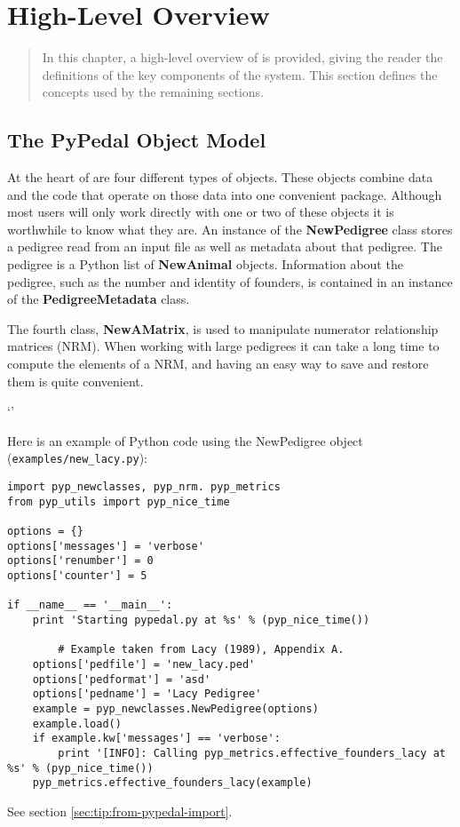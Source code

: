 \chapter{High-Level Overview}
\label{cha:high-level-overview}

\begin{quote} 
   In this chapter, a high-level overview of \PYPEDAL{} is provided, giving
   the reader the definitions of the key components of the system. This section
   defines the concepts used by the remaining sections.
\end{quote}

\section{The PyPedal Object Model}
\label{sec:pypedal-objects}

At the heart of \PyPedal{} are four different types of objects.  These objects
combine data and the code that operate on those data into one convenient package.
Although most \PyPedal{} users will only work directly with one or two of these
objects it is worthwhile to know what they are.  An instance of the
\textbf{NewPedigree} class stores a pedigree read from an input file as well as
metadata about that pedigree.  The pedigree is a Python list of \textbf{NewAnimal}
objects.  Information about the pedigree, such as the number and identity of founders,
is contained in an instance of the \textbf{PedigreeMetadata} class.

The fourth \PyPedal{} class, \textbf{New{AM}atrix}, is used to manipulate numerator
relationship matrices (NRM).  When working with large pedigrees it can take a long
time to compute the elements of a NRM, and having an easy way to save and restore
them is quite convenient.

`'

Here is an example of Python code using the NewPedigree object (\texttt{examples/new_lacy.py}):
\begin{verbatim}
import pyp_newclasses, pyp_nrm. pyp_metrics
from pyp_utils import pyp_nice_time

options = {}
options['messages'] = 'verbose'
options['renumber'] = 0
options['counter'] = 5

if __name__ == '__main__':
    print 'Starting pypedal.py at %s' % (pyp_nice_time())
    
		# Example taken from Lacy (1989), Appendix A. 
    options['pedfile'] = 'new_lacy.ped'
    options['pedformat'] = 'asd'
    options['pedname'] = 'Lacy Pedigree'
    example = pyp_newclasses.NewPedigree(options)
    example.load()
    if example.kw['messages'] == 'verbose':
        print '[INFO]: Calling pyp_metrics.effective_founders_lacy at %s' % (pyp_nice_time())
    pyp_metrics.effective_founders_lacy(example)
\end{verbatim}
See section \ref{sec:tip:from-pypedal-import}.

